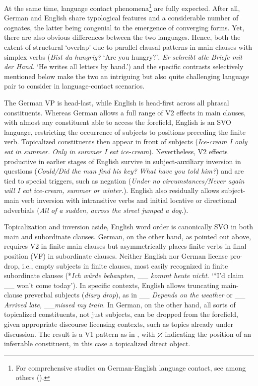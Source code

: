 \documentclass[output=paper]{langscibook}
\begin{document}
At the same time, language contact phenomena\footnote{For comprehensive studies on German-English language contact, see among others (\citealt{Clyne2003, Johanson2002, Johanson2008, LatteyTracy2001, TracyLattey2010, Stolberg2014, Keller2014}).} are fully expected. After all, German and English share typological features and a considerable number of cognates, the latter being congenial to the emergence of converging forms. Yet, there are also obvious differences between the two languages. Hence, both the extent of structural ‘overlap’ due to parallel clausal patterns in main clauses with simplex verbs (\textit{Bist du hungrig?} ‘Are you hungry?’, \textit{Er schreibt alle Briefe mit der Hand.} ‘He writes all letters by hand.’) and the specific contrasts selectively mentioned below make the two an intriguing but also quite challenging language pair to consider in language-contact scenarios.

The German VP is head-last, while English is head-first across all phrasal constituents. Whereas German allows a full range of V2 effects in main clauses, with almost any constituent able to access the forefield, English is an SVO language, restricting the occurrence of subjects to positions preceding the finite verb. Topicalized constituents then appear in front of subjects (\textit{Ice-cream I only eat in summer.} \textit{Only in summer I eat ice-cream}). Nevertheless, V2 effects productive in earlier stages of English survive in subject-auxiliary inversion in questions (\textit{Could/Did the man find his key? What have you told him?}) and are tied to special triggers, such as negation (\textit{Under no circumstances/Never again will I eat ice-cream, summer or winter.}). English also residually allows subject-main verb inversion with intransitive verbs and initial locative or directional adverbials (\textit{All of a sudden, across the street jumped a dog.}).

Topicalization and inversion aside, English word order is canonically SVO in both main and subordinate clauses. German, on the other hand, as pointed out above, requires V2 in finite main clauses but asymmetrically places finite verbs in final position (VF) in subordinate clauses. Neither English nor German license pro-drop, i.e., empty subjects in finite clauses, most easily recognized in finite subordinate clauses (*\textit{Ich würde behaupten, \_\_ kommt heute nicht}. ‘*I’d claim \_\_ won’t come today’). In specific contexts, English allows truncating main-clause preverbal subjects (\textit{diary drop}), as in  \_\_ \textit{Depends on the weather} or \_\_ \textit{Arrived late, \_\_missed my train}. In German, on the other hand, all sorts of topicalized constituents, not just subjects, can be dropped from the forefield, given appropriate discourse licensing contexts, such as topics already under discussion. The result is a V1 pattern as in , with ${\varnothing}$ indicating the position of an inferrable constituent, in this case a topicalized direct object.
\end{document}
